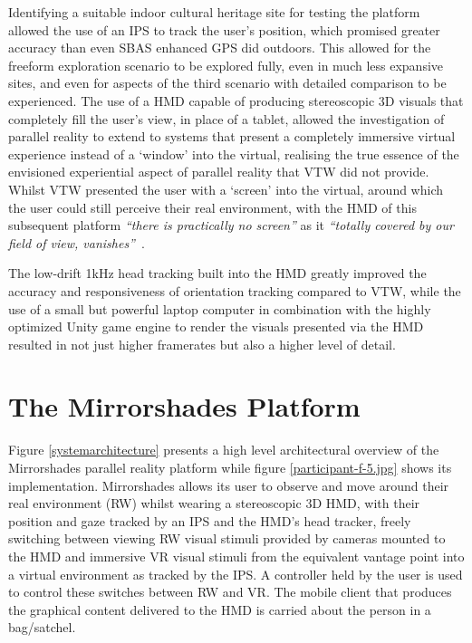 Identifying a suitable indoor cultural heritage site for testing the platform allowed the use of an IPS to track the user's position, which promised greater accuracy than even SBAS enhanced GPS did outdoors. This allowed for the freeform exploration scenario to be explored fully, even in much less expansive sites, and even for aspects of the third scenario with detailed comparison to be experienced. The use of a HMD capable of producing stereoscopic 3D visuals that completely fill the user's view, in place of a tablet, allowed the investigation of parallel reality to extend to systems that present a completely immersive virtual experience instead of a `window' into the virtual, realising the true essence of the envisioned experiential aspect of parallel reality that VTW did not provide. Whilst VTW presented the user with a `screen' into the virtual, around which the user could still perceive their real environment, with the HMD of this subsequent platform \textit{``there is practically no screen''} as it \textit{``totally covered by our field of view, vanishes''}~\cite{Tzortzaki2002}.

The low-drift 1kHz head tracking built into the HMD greatly improved the accuracy and responsiveness of orientation tracking compared to VTW, while the use of a small but powerful laptop computer in combination with the highly optimized Unity game engine to render the visuals presented via the HMD resulted in not just higher framerates but also a higher level of detail.


\section{The Mirrorshades Platform}
\label{the-mirrorshades-platform}
Figure \ref{systemarchitecture} presents a high level architectural overview of the Mirrorshades parallel reality platform while figure \ref{participant-f-5.jpg} shows its implementation. Mirrorshades allows its user to observe and move around their real environment (RW) whilst wearing a stereoscopic 3D HMD, with their position and gaze tracked by an IPS and the HMD's head tracker, freely switching between viewing RW visual stimuli provided by cameras mounted to the HMD and immersive VR visual stimuli from the equivalent vantage point into a virtual environment as tracked by the IPS. A controller held by the user is used to control these switches between RW and VR. The mobile client that produces the graphical content delivered to the HMD is carried about the person in a bag/satchel.

